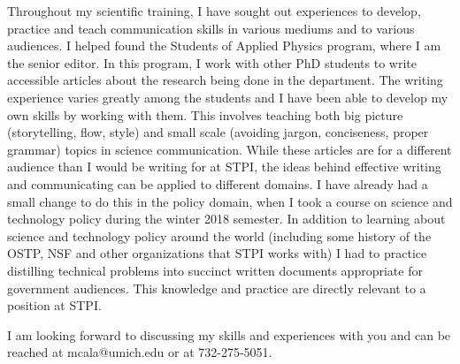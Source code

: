 Throughout my scientific training, I have sought out experiences to develop, practice and teach communication skills in various mediums and to various audiences. I helped found the Students of Applied Physics program, where I am the senior editor. In this program, I work with other PhD students to write accessible articles about the research being done in the department. The writing experience varies greatly among the students and I have been able to develop my own skills by working with them. This involves teaching both big picture (storytelling, flow, style) and small scale (avoiding jargon, conciseness, proper grammar) topics in science communication. While these articles are for a different audience than I would be writing for at STPI, the ideas behind effective writing and communicating can be applied to different domains. I have already had a small change to do this in the policy domain, when I took a course on science and technology policy during the winter 2018 semester. In addition to learning about science and technology policy around the world (including some history of the OSTP, NSF and other organizations that STPI works with) I had to practice distilling technical problems into succinct written documents appropriate for government audiences. This knowledge and practice are directly relevant to a position at STPI.

I am looking forward to discussing my skills and experiences with you and can be reached at mcala@umich.edu or at 732-275-5051.

\makeletterclosing
